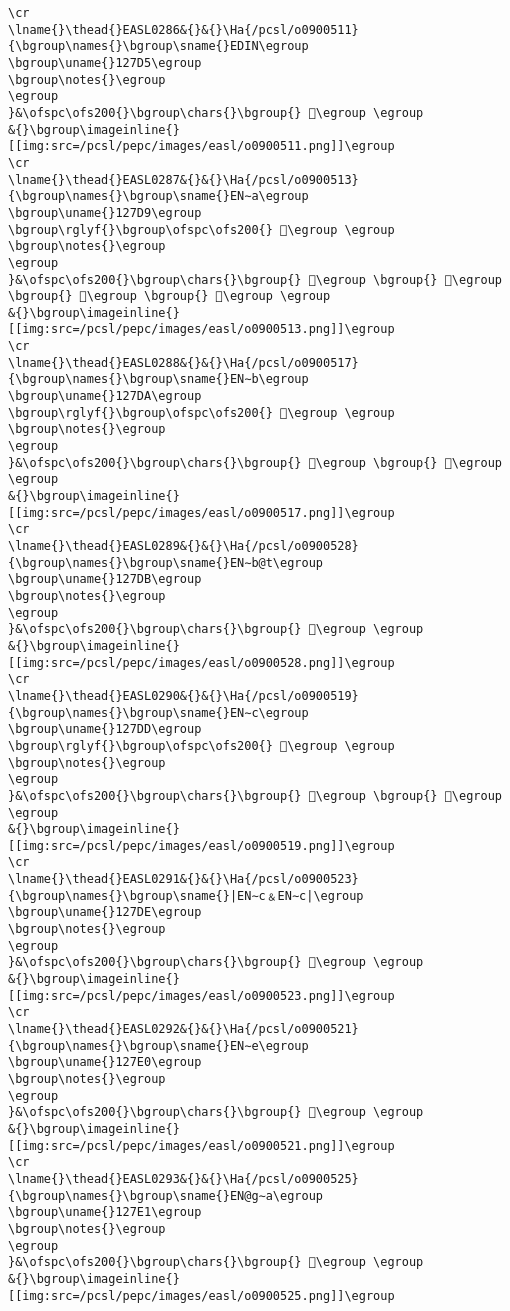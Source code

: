 \begin{verbatim}
\cr
\lname{}\thead{}EASL0286&{}&{}\Ha{/pcsl/o0900511}{\bgroup\names{}\bgroup\sname{}EDIN\egroup
\bgroup\uname{}127D5\egroup
\bgroup\notes{}\egroup
\egroup
}&\ofspc\ofs200{}\bgroup\chars{}\bgroup{} 𒟕\egroup \egroup
&{}\bgroup\imageinline{}[[img:src=/pcsl/pepc/images/easl/o0900511.png]]\egroup
\cr
\lname{}\thead{}EASL0287&{}&{}\Ha{/pcsl/o0900513}{\bgroup\names{}\bgroup\sname{}EN∼a\egroup
\bgroup\uname{}127D9\egroup
\bgroup\rglyf{}\bgroup\ofspc\ofs200{} 𒟙\egroup \egroup
\bgroup\notes{}\egroup
\egroup
}&\ofspc\ofs200{}\bgroup\chars{}\bgroup{} 𒟖\egroup \bgroup{} 𒟗\egroup \bgroup{} 𒟘\egroup \bgroup{} 𒟙\egroup \egroup
&{}\bgroup\imageinline{}[[img:src=/pcsl/pepc/images/easl/o0900513.png]]\egroup
\cr
\lname{}\thead{}EASL0288&{}&{}\Ha{/pcsl/o0900517}{\bgroup\names{}\bgroup\sname{}EN∼b\egroup
\bgroup\uname{}127DA\egroup
\bgroup\rglyf{}\bgroup\ofspc\ofs200{} 𒟚\egroup \egroup
\bgroup\notes{}\egroup
\egroup
}&\ofspc\ofs200{}\bgroup\chars{}\bgroup{} 𒟚\egroup \bgroup{} 𒟜\egroup \egroup
&{}\bgroup\imageinline{}[[img:src=/pcsl/pepc/images/easl/o0900517.png]]\egroup
\cr
\lname{}\thead{}EASL0289&{}&{}\Ha{/pcsl/o0900528}{\bgroup\names{}\bgroup\sname{}EN∼b@t\egroup
\bgroup\uname{}127DB\egroup
\bgroup\notes{}\egroup
\egroup
}&\ofspc\ofs200{}\bgroup\chars{}\bgroup{} 𒟛\egroup \egroup
&{}\bgroup\imageinline{}[[img:src=/pcsl/pepc/images/easl/o0900528.png]]\egroup
\cr
\lname{}\thead{}EASL0290&{}&{}\Ha{/pcsl/o0900519}{\bgroup\names{}\bgroup\sname{}EN∼c\egroup
\bgroup\uname{}127DD\egroup
\bgroup\rglyf{}\bgroup\ofspc\ofs200{} 𒟝\egroup \egroup
\bgroup\notes{}\egroup
\egroup
}&\ofspc\ofs200{}\bgroup\chars{}\bgroup{} 𒟝\egroup \bgroup{} 𒟟\egroup \egroup
&{}\bgroup\imageinline{}[[img:src=/pcsl/pepc/images/easl/o0900519.png]]\egroup
\cr
\lname{}\thead{}EASL0291&{}&{}\Ha{/pcsl/o0900523}{\bgroup\names{}\bgroup\sname{}|EN∼c﹠EN∼c|\egroup
\bgroup\uname{}127DE\egroup
\bgroup\notes{}\egroup
\egroup
}&\ofspc\ofs200{}\bgroup\chars{}\bgroup{} 𒟞\egroup \egroup
&{}\bgroup\imageinline{}[[img:src=/pcsl/pepc/images/easl/o0900523.png]]\egroup
\cr
\lname{}\thead{}EASL0292&{}&{}\Ha{/pcsl/o0900521}{\bgroup\names{}\bgroup\sname{}EN∼e\egroup
\bgroup\uname{}127E0\egroup
\bgroup\notes{}\egroup
\egroup
}&\ofspc\ofs200{}\bgroup\chars{}\bgroup{} 𒟠\egroup \egroup
&{}\bgroup\imageinline{}[[img:src=/pcsl/pepc/images/easl/o0900521.png]]\egroup
\cr
\lname{}\thead{}EASL0293&{}&{}\Ha{/pcsl/o0900525}{\bgroup\names{}\bgroup\sname{}EN@g∼a\egroup
\bgroup\uname{}127E1\egroup
\bgroup\notes{}\egroup
\egroup
}&\ofspc\ofs200{}\bgroup\chars{}\bgroup{} 𒟡\egroup \egroup
&{}\bgroup\imageinline{}[[img:src=/pcsl/pepc/images/easl/o0900525.png]]\egroup

\end{verbatim}
